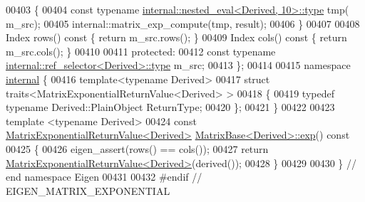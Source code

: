 \begin{DoxyCode}
00403 \textcolor{keyword}{    }\{
00404       \textcolor{keyword}{const} \textcolor{keyword}{typename} \hyperlink{class_eigen_1_1internal_1_1_tensor_lazy_evaluator_writable}{internal::nested\_eval<Derived, 10>::type} tmp(
      m\_src);
00405       internal::matrix\_exp\_compute(tmp, result);
00406     \}
00407 
00408     Index rows()\textcolor{keyword}{ const }\{ \textcolor{keywordflow}{return} m\_src.rows(); \}
00409     Index cols()\textcolor{keyword}{ const }\{ \textcolor{keywordflow}{return} m\_src.cols(); \}
00410 
00411   \textcolor{keyword}{protected}:
00412     \textcolor{keyword}{const} \textcolor{keyword}{typename} \hyperlink{class_eigen_1_1internal_1_1_tensor_lazy_evaluator_writable}{internal::ref\_selector<Derived>::type} m\_src;
00413 \};
00414 
00415 \textcolor{keyword}{namespace }\hyperlink{namespaceinternal}{internal} \{
00416 \textcolor{keyword}{template}<\textcolor{keyword}{typename} Derived>
00417 \textcolor{keyword}{struct }traits<MatrixExponentialReturnValue<Derived> >
00418 \{
00419   \textcolor{keyword}{typedef} \textcolor{keyword}{typename} Derived::PlainObject ReturnType;
00420 \};
00421 \}
00422 
00423 \textcolor{keyword}{template} <\textcolor{keyword}{typename} Derived>
00424 \textcolor{keyword}{const} \hyperlink{struct_eigen_1_1_matrix_exponential_return_value}{MatrixExponentialReturnValue<Derived>} 
      \hyperlink{group___core___module_class_eigen_1_1_matrix_base}{MatrixBase<Derived>::exp}()\textcolor{keyword}{ const}
00425 \textcolor{keyword}{}\{
00426   eigen\_assert(rows() == cols());
00427   \textcolor{keywordflow}{return} \hyperlink{struct_eigen_1_1_matrix_exponential_return_value}{MatrixExponentialReturnValue<Derived>}(derived());
00428 \}
00429 
00430 \} \textcolor{comment}{// end namespace Eigen}
00431 
00432 \textcolor{preprocessor}{#endif // EIGEN\_MATRIX\_EXPONENTIAL}
\end{DoxyCode}
